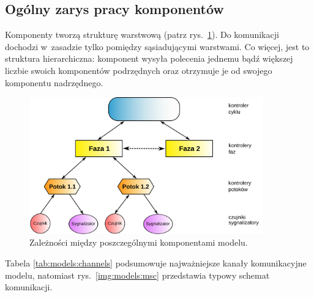 \documentclass{pracamgr}
\newcommand{\imgr}[1]{rys.~\ref{#1}}
\theoremstyle{plain}
\begin{document}
\subsection{Ogólny zarys pracy komponentów}
\label{ss:models:models:summary}
Komponenty tworzą strukturę warstwową (patrz \imgr{img:hierarchy}). Do
komunikacji dochodzi w~zasadzie tylko pomiędzy sąsiadującymi
warstwami. Co więcej, jest to struktura hierarchiczna: komponent
wysyła polecenia jednemu bądź większej liczbie swoich komponentów
podrzędnych oraz otrzymuje je od swojego komponentu nadrzędnego.
\begin{figure}[h]
  \centering
  \includegraphics[width=0.9\textwidth]{img/models-hierarchy}
  \caption{Zależności między poszczególnymi komponentami modelu.}
  \label{img:hierarchy}
\end{figure}

Tabela \ref{tab:models:channels} podsumowuje najważniejsze kanały
komunikacyjne modelu, natomiast \imgr{img:models:msc} przedstawia
typowy schemat komunikacji.
\end{document}
